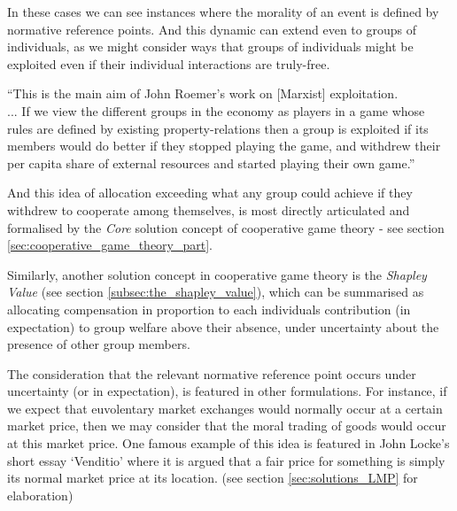 In these cases we can see instances where the morality of an event is defined by normative reference points. And this dynamic can extend even to groups of individuals, as we might consider ways that groups of individuals might be exploited even if their individual interactions are truly-free.
\begin{displayquote}
``This is the main aim of John Roemer's work on [Marxist] exploitation.\\... %
If we view the different groups in the economy as players in a game whose rules are defined by existing property-relations then a group is exploited if its members would do better if they stopped playing the game, and withdrew their per capita share of external resources and started playing their own game.'' \citep{kymlicka2002contemporary}
\end{displayquote}
And this idea of allocation exceeding what any group could achieve if they withdrew to cooperate among themselves, is most directly articulated and formalised by the \textit{Core} solution concept of cooperative game theory - see section \ref{sec:cooperative_game_theory_part}.

Similarly, another solution concept in cooperative game theory is the \textit{Shapley Value} (see section \ref{subsec:the_shapley_value}), which can be summarised as allocating compensation in proportion to each individuals contribution (in expectation) to group welfare above their absence, under uncertainty about the presence of other group members.

The consideration that the relevant normative reference point occurs under uncertainty (or in expectation), is featured in other formulations.
For instance, if we expect that euvolentary market exchanges would normally occur at a certain market price, then we may consider that the moral trading of goods would occur at this market price.
One famous example of this idea is featured in John Locke's short essay `Venditio' \citep{locke2003locke} where it is argued that a fair price for something is simply its normal market price at its location. (see section \ref{sec:solutions_LMP} for elaboration)


